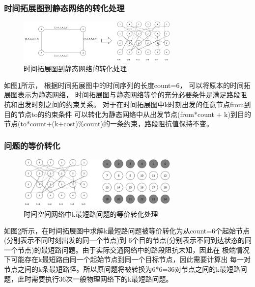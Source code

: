 \subsubsection{时间拓展图到静态网络的转化处理}
\begin{figure}[H] %
    \centering %
    \includegraphics[width=0.7\textwidth]{png/图片15时间拓展图到静态网络的转化处理} %
    \caption{时间拓展图到静态网络的转化处理} %
    \label{fig:fig15} %
\end{figure}
如图\ref{fig:fig15}所示，
根据时间拓展图中的时间序列的长度count=6，
可以将原本的时间拓展图表示为静态网络，
时间拓展图与静态网络等价的充分必要条件是满足路段阻抗和出发时刻之间的约束关系。
对于在时间拓展图中k时刻出发的任意节点from到目的节点to的约束条件
可以转化为静态网络中从出发节点(from*count + k)到目的节点(to*count+(k+cost)\%count)的一条约束，路段阻抗值保持不变。

\subsubsection{问题的等价转化}
\begin{figure}[H] %
    \centering %
    \includegraphics[width=0.7\textwidth]{png/图片16时间空间网络中k最短路问题的等价转化处理} %
    \caption{时间空间网络中k最短路问题的等价转化处理} %
    \label{fig:fig16} %
\end{figure}

如图\ref{fig:fig16}所示，在时间拓展图中求解k最短路问题被等价转化为从count=6个起始节点(分别表示不同时刻出发的同一个节点)到
6个目的节点(分别表示不同到达状态的同一个节点)的最短路问题。由于实际交通网络中的路段阻抗未知，因此在
极端情况下可能存在k最短路由同一个起始节点到同一个目标节点，因此需要计算出
每一对节点之间的k条最短路径。所以原问题将被转换为6*6=36对节点之间的k最短路问题，此时需要执行36次一般物理网络下的k最短路问题。